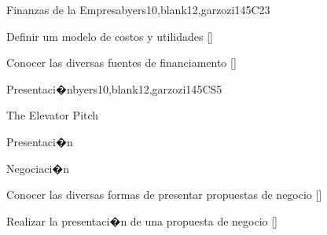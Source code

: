 \begin{syllabus}
\begin{unit}{}{Finanzas de la Empresa}{byers10,blank12,garzozi14}{5}{C23}
   \begin{learningoutcomes} 
      \item Definir um modelo de costos y utilidades  [\Assessment]
      \item Conocer las diversas fuentes de financiamento  [\Familiarity]
   \end{learningoutcomes} 
\end{unit}

\begin{unit}{}{Presentaci�n}{byers10,blank12,garzozi14}{5}{CS5}
	\begin{topics}
      \item The Elevator Pitch
      \item Presentaci�n
      \item Negociaci�n
    \end{topics}

   \begin{learningoutcomes} 
      \item Conocer las diversas formas de presentar propuestas de negocio  [\Familiarity]
      \item Realizar la presentaci�n de una propuesta de negocio  [\Usage]
   \end{learningoutcomes} 
\end{unit}

\begin{coursebibliography}
\end{coursebibliography}

\end{syllabus}

%
